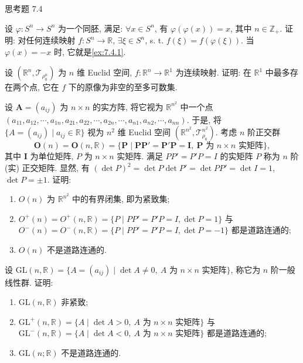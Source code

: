 \begin{exblock}{思考题 7.4}
  \item 设 $\varphi\colon S^{n} \to S^{n}$ 为一个同胚, 满足: $\forall x \in S^{n}$, 有 $\varphi(\varphi(x)) = x$, 其中 $n \in \mathbb{Z}_{+}$. 证明: 对任何连续映射 $f\colon S^{n} \to \mathbb{R}$, $\exists \xi \in S^{n}$, s. t. $f(\xi) = f(\varphi(\xi))$. 当 $\varphi(x) = -x$ 时, 它就是\cref{ex:7.4.1}.

  \item 设 $(\mathbb{R}^{n}, \mathcal{T}_{\rho_{0}^{n}})$ 为 $n$ 维 Euclid 空间, $f\colon \mathbb{R}^{n} \to \mathbb{R}^{1}$ 为连续映射. 证明: 在 $\mathbb{R}^{1}$ 中最多存在两个点, 它在 $f$ 下的原像为非空的至多可数集.

  \item 设 $\boldsymbol{A} = (a_{ij})$ 为 $n \times n$ 的实方阵, 将它视为 $\mathbb{R}^{n^{2}}$ 中一个点 $(a_{11}, a_{12}, \cdots,\allowbreak a_{1n}, a_{21}, a_{22}, \cdots,\allowbreak a_{2n}, \cdots,\allowbreak a_{n1}, a_{n2}, \cdots, a_{nn})$. 于是, 将 $\{A = (a_{ij}) \mid a_{ij} \in \mathbb{R}\}$ 视为 $n^{2}$ 维 Euclid 空间 $(\mathbb{R}^{n^{2}}, \mathcal{T}_{\rho_{0}}^{n^{2}})$. 考虑 $n$ 阶正交群
  \[
    \boldsymbol{O}(n) = \boldsymbol{O}(n, \mathbb{R}) = \{\boldsymbol{P} \mid \boldsymbol{P}\boldsymbol{P}' = \boldsymbol{P}'\boldsymbol{P} = \boldsymbol{I},\ \boldsymbol{P} \text{ 为 } n \times n \text{ 实矩阵}\},
  \]
  其中 $\boldsymbol{I}$ 为单位矩阵, $P$ 为 $n \times n$ 实矩阵. 满足 $PP' = P'P = I$ 的实矩阵 $P$ 称为 $n$ 阶 (实) 正交矩阵. 显然, 有 $(\det P)^{2} = \det P \det P' = \det PP' = \det I = 1$, $\det P = \pm 1$. 证明:
  \begin{enumerate}
    \item $O(n)$ 为 $\mathbb{R}^{n^{2}}$ 中的有界闭集, 即为紧致集;
    \item $O^{+}(n) = O^{+}(n, \mathbb{R}) = \{P \mid PP' = P'P = I, \det P = 1\}$ 与 $O^{-}(n) = O^{-}(n, \mathbb{R}) = \{P \mid PP' = P'P = I, \det P = -1\}$ 都是道路连通的;
    \item $O(n)$ 不是道路连通的.
  \end{enumerate}

  \item 设 $\mathrm{GL}(n, \mathbb{R}) = \{A = (a_{ij}) \mid \det A \neq 0,\ A \text{ 为 } n \times n \text{ 实矩阵}\}$, 称它为 $n$ 阶一般线性群. 证明:
  \begin{enumerate}
    \item $\mathrm{GL}(n, \mathbb{R})$ 非紧致;
    \item $\mathrm{GL}^{+}(n, \mathbb{R}) = \{A \mid \det A > 0,\ A \text{ 为 } n \times n \text{ 实矩阵}\}$ 与 $\mathrm{GL}^{-}(n, \mathbb{R}) = \{A \mid \det A < 0,\ A \text{ 为 } n \times n \text{ 实矩阵}\}$ 都是道路连通的;
    \item $\mathrm{GL}(n; \mathbb{R})$ 不是道路连通的.
  \end{enumerate}
\end{exblock}
